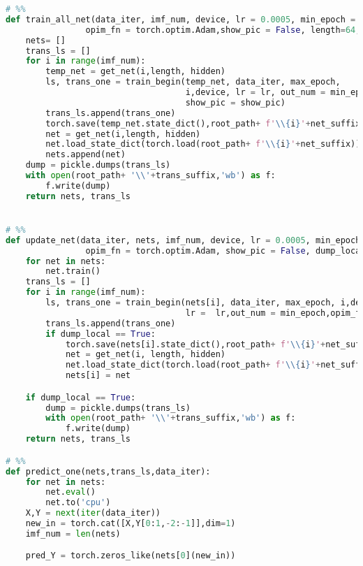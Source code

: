 \begin{appendices}
\begin{lstlisting}[language=python]
# %%
def train_all_net(data_iter, imf_num, device, lr = 0.0005, min_epoch = 800, max_epoch = 10000, root_path='net',net_suffix='_lstm.pkl',trans_suffix= 'trans_ls.info',
                opim_fn = torch.optim.Adam,show_pic = False, length=64, hidden=256):
    nets= []
    trans_ls = []
    for i in range(imf_num):
        temp_net = get_net(i,length, hidden)
        ls, trans_one = train_begin(temp_net, data_iter, max_epoch,
                                    i,device, lr = lr, out_num = min_epoch,opim_fn=opim_fn,
                                    show_pic = show_pic)
        trans_ls.append(trans_one)
        torch.save(temp_net.state_dict(),root_path+ f'\\{i}'+net_suffix)
        net = get_net(i,length, hidden)
        net.load_state_dict(torch.load(root_path+ f'\\{i}'+net_suffix))
        nets.append(net)
    dump = pickle.dumps(trans_ls)
    with open(root_path+ '\\'+trans_suffix,'wb') as f:
        f.write(dump)
    return nets, trans_ls


# %%
def update_net(data_iter, nets, imf_num, device, lr = 0.0005, min_epoch = 800, max_epoch = 10000, root_path='net',net_suffix='_lstm.pkl',trans_suffix= 'trans_ls.info',
                opim_fn = torch.optim.Adam, show_pic = False, dump_local = False, length=64, hidden=256):
    for net in nets:
        net.train()
    trans_ls = []
    for i in range(imf_num):
        ls, trans_one = train_begin(nets[i], data_iter, max_epoch, i,device,
                                    lr =  lr,out_num = min_epoch,opim_fn=opim_fn, show_pic= show_pic)
        trans_ls.append(trans_one)
        if dump_local == True:
            torch.save(nets[i].state_dict(),root_path+ f'\\{i}'+net_suffix)
            net = get_net(i, length, hidden)
            net.load_state_dict(torch.load(root_path+ f'\\{i}'+net_suffix))
            nets[i] = net

    if dump_local == True:
        dump = pickle.dumps(trans_ls)
        with open(root_path+ '\\'+trans_suffix,'wb') as f:
            f.write(dump)
    return nets, trans_ls

# %%
def predict_one(nets,trans_ls,data_iter):
    for net in nets:
        net.eval()
        net.to('cpu')
    X,Y = next(iter(data_iter))
    new_in = torch.cat([X,Y[0:1,-2:-1]],dim=1)
    imf_num = len(nets)

    pred_Y = torch.zeros_like(nets[0](new_in))


\end{lstlisting}
\end{appendices}
